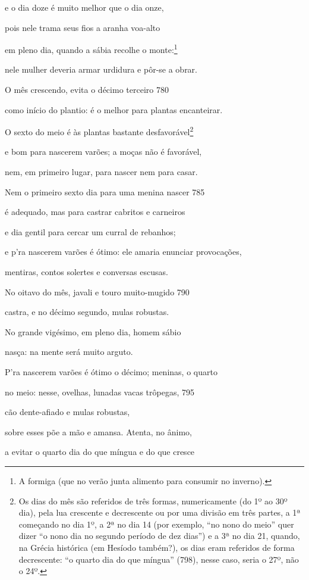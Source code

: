 e o dia doze é muito melhor que o dia onze,

pois nele trama seus fios a aranha voa-alto

em pleno dia, quando a sábia recolhe o monte:\footnote{A formiga (que no verão junta alimento para consumir no inverno).}

nele mulher deveria armar urdidura e pôr-se a obrar.

O mês crescendo, evita o décimo terceiro \num{780}

como início do plantio: é o melhor para plantas encanteirar.

O sexto do meio é às plantas bastante desfavorável\footnote{Os dias do mês são referidos de três formas, numericamente (do 1º
ao 30º dia), pela lua crescente e decrescente ou por uma divisão em três
partes, a 1ª começando no dia 1º, a 2ª no dia 14 (por exemplo, ``no nono
do meio'' quer dizer ``o nono dia no segundo período de dez dias'') e a
3ª no dia 21, quando, na Grécia histórica (em Hesíodo também?), os dias
eram referidos de forma decrescente: ``o quarto dia do que míngua''
(798), nesse caso, seria o 27º, não o 24º.}

e bom para nascerem varões; a moças não é favorável,

nem, em primeiro lugar, para nascer nem para casar.

Nem o primeiro sexto dia para uma menina nascer \num{785}

é adequado, mas para castrar cabritos e carneiros

e dia gentil para cercar um curral de rebanhos;

e p'ra nascerem varões é ótimo: ele amaria enunciar provocações,

mentiras, contos solertes e conversas escusas.

No oitavo do mês, javali e touro muito-mugido \num{790}

castra, e no décimo segundo, mulas robustas.

No grande vigésimo, em pleno dia, homem sábio

nasça: na mente será muito arguto.

P'ra nascerem varões é ótimo o décimo; meninas, o quarto

no meio: nesse, ovelhas, lunadas vacas trôpegas, \num{795}

cão dente-afiado e mulas robustas,

sobre esses põe a mão e amansa. Atenta, no ânimo,

a evitar o quarto dia do que míngua e do que cresce

